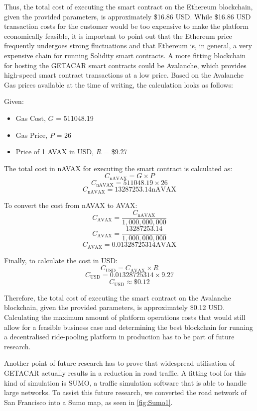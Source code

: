 Thus, the total cost of executing the smart contract on the Ethereum blockchain, given the provided parameters, is approximately \$16.86 USD. While \$16.86 USD transaction costs for the customer would be too expensive to make the platform economically feasible, it is important to point out that the Ethereum price frequently undergoes strong fluctuations and that Ethereum is, in general, a very expensive chain for running Solidity smart contracts. A more fitting blockchain for hosting the GETACAR smart contracts could be Avalanche, which provides high-speed smart contract transactions at a low price. Based on the Avalanche Gas prices available at the time of writing, the calculation looks as follows:

Given:
\begin{itemize}
    \item Gas Cost, \( G \) = 511048.19
    \item Gas Price, \( P \) = 26 
    \item Price of 1 AVAX in USD, \( R \) = \$9.27
\end{itemize}

The total cost in nAVAX for executing the smart contract is calculated as:
\[ C_{\text{nAVAX}} = G \times P \]
\[ C_{\text{nAVAX}} = 511048.19 \times 26 \]
\[ C_{\text{nAVAX}} = 13287253.14 \text{nAVAX} \]

To convert the cost from nAVAX to AVAX:
\[ C_{\text{AVAX}} = \frac{C_{\text{nAVAX}}}{1,000,000,000} \]
\[ C_{\text{AVAX}} = \frac{13287253.14}{1,000,000,000} \]
\[ C_{\text{AVAX}} = 0.01328725314 \text{AVAX} \]

Finally, to calculate the cost in USD:
\[ C_{\text{USD}} = C_{\text{AVAX}} \times R \]
\[ C_{\text{USD}} = 0.01328725314 \times 9.27 \]
\[ C_{\text{USD}} \approx \$0.12 \]

Therefore, the total cost of executing the smart contract on the Avalanche blockchain, given the provided parameters, is approximately \$0.12 USD. Calculating the maximum amount of platform operations costs that would still allow for a feasible business case and determining the best blockchain for running a decentralised ride-pooling platform in production has to be part of future research. 

Another point of future research has to prove that widespread utilisation of GETACAR actually results in a reduction in road traffic. A fitting tool for this kind of simulation is SUMO, a  traffic simulation software that is able to handle large networks. To assist this future research, we converted the road network of San Francisco into a Sumo map, as seen in \ref{fig:Sumo1}. 

